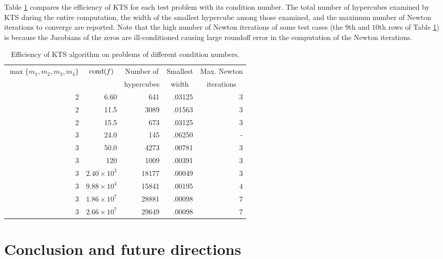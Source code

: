 \documentclass{article}
\newcommand{\cond}[1]{\mathop{\rm{cond}}(#1)}
\begin{document}
Table \ref{table_res} compares the efficiency of KTS for each test
problem with its condition number.  The total number of hypercubes
examined by KTS during the entire computation, the width of the
smallest hypercube among those examined, and the maximum number of
Newton iterations to converge are reported.  Note that the high
number of Newton iterations of some test cases (the $9$th and $10$th rows of Table \ref{table_res}) is because the Jacobians of the zeros are ill-conditioned causing large roundoff error in the computation of the Newton iterations.


\begin{table}
\begin{center}
\begin{tabular}{|r|r|r|r|r|}
\hline \multirow{2}{*}{$\max \{m_1,m_2,m_3,m_4 \}$} &
\multicolumn{1}{|c|}{\multirow{2}{*}{$\cond{f}$}} & \multicolumn{1}{|c|}{Number of} & \multicolumn{1}{|c|}{Smallest} &
Max. Newton \\
& & hypercubes & \multicolumn{1}{|c|}{width} & \multicolumn{1}{|c|}{iterations} \\
\hline 2 & 6.60 & 641 & .03125 & 3 \\   2 & 11.5 & 3089 & .01563 & 3 \\ 2 & 15.5 & 673 & .03125 & 3 \\  3 & 24.0 & 145 & .06250 & - \\ 3 & 50.0 & 4273 & .00781 & 3 \\ 3 & 120 & 1009 & .00391 & 3 \\ 3 & $2.40 \times 10^3$ & 18177 & .00049 & 3 \\ 3 & $9.88 \times 10^4$ & 15841 & .00195 & 4 \\ 3 & $1.86 \times 10^7$ &  28881 & .00098 & 7 \\ 3& $2.66 \times 10^7$ & 29649 & .00098 & 7 \\ \hline
\end{tabular}
\end{center}
\caption{Efficiency of KTS algorithm on problems of different
condition numbers.\label{table_res}}
\end{table}


\section{Conclusion and future directions}
\label{section_conclusion}
\end{document}
